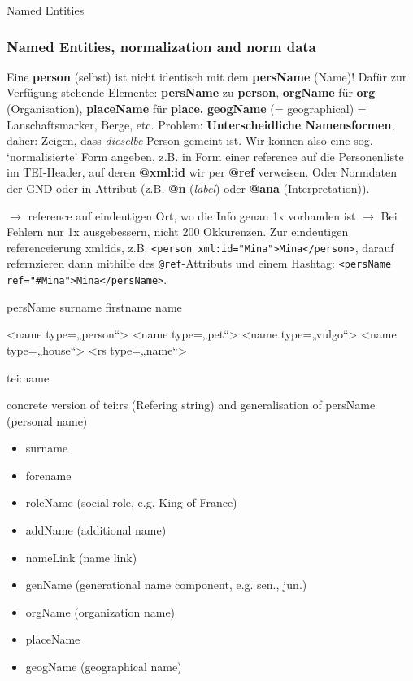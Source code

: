 \begin{frame}{Named Entities}
\subsubsection{Named Entities, normalization and norm data}

Eine \textbf{person} (selbst) ist nicht identisch mit dem \textbf{persName} (Name)! Dafür zur Verfügung stehende Elemente: \textbf{persName} zu \textbf{person}, \textbf{orgName} für \textbf{org} (Organisation), \textbf{placeName} für \textbf{place.} \textbf{geogName} (= geographical) = Lanschaftsmarker, Berge, etc.
Problem: \textbf{Unterscheidliche Namensformen}, daher:
 Zeigen, dass \emph{dieselbe} Person gemeint ist. Wir können also eine sog. `normalisierte' Form angeben, z.B. in Form einer reference auf die Personenliste im TEI-Header, auf deren \textbf{@xml:id} wir per \textbf{@ref} verweisen. Oder Normdaten der GND oder in Attribut (z.B. \textbf{@n} (\emph{label}) oder \textbf{@ana} (Interpretation)). 

 $\to$ reference auf eindeutigen Ort, wo die Info genau 1x vorhanden ist $\to$ Bei Fehlern nur 1x ausgebessern, nicht 200 Okkurenzen. Zur eindeutigen referenceierung xml:ids, z.B. \verb|<person xml:id="Mina">Mina</person>|, darauf refernzieren dann mithilfe des \texttt{@ref}-Attributs und einem Hashtag: \verb|<persName ref="#Mina">Mina</persName>|.

persName
surname
firstname
name
\begin{xmlcode}
<name type=„person“>
<name type=„pet“>
<name type=„vulgo“>
<name type=„house“>
<rs type=„name“>
\end{xmlcode}


tei:name

concrete version of tei:rs (Refering string) and generalisation of
persName (personal name)

\begin{itemize}
    \item surname 
    \item forename 
    \item roleName (social role, e.g. King of France)
    \item addName (additional name) 
    \item nameLink (name link)
    \item genName (generational name component, e.g. sen., jun.)
    \item orgName (organization name)
    \item placeName
    \item geogName (geographical name)
\end{itemize}


\end{frame}
